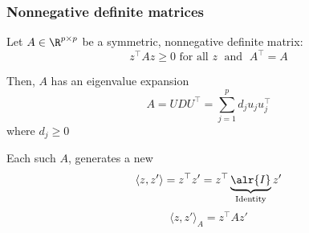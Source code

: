 \documentclass[12pt]{beamer}
\begin{document}

%
%
%
%
%

%
%
%
%

\begin{frame}
\frametitle{Nonnegative definite matrices}
Let $A \in \R^{p \times p}$ be a symmetric, nonnegative definite matrix:
\[
z^{\top}Az \geq 0 \textrm{ for all } z \; \textrm{ and } \; A^{\top} = A
\]

Then, $A$ has an eigenvalue expansion
\[
A = UDU^{\top} = \sum_{j=1}^p d_j u_j u_j^{\top}
\]
where $d_j \geq 0$

\vsp
{} Each such $A$, generates a new 
\[
\langle z, z' \rangle = z^{\top}z'  = z^{\top} \underbrace{\alr{I}}_{\textrm{Identity}} z'
\]
\[
\langle z, z' \rangle_A = z^{\top}A z'
\]

\end{frame}
\end{document}
